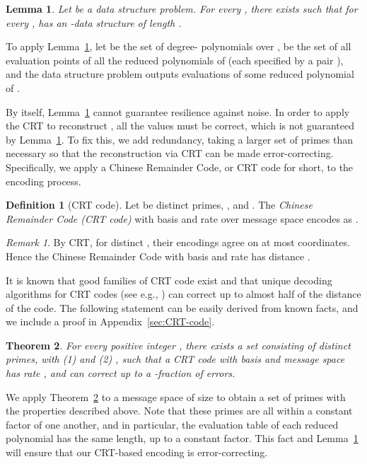 \documentclass[11pt,english]{article}
\newtheorem{theorem}{Theorem}
\newtheorem{lem}[theorem]{Lemma}
\theoremstyle{definition}
\newtheorem{defn}{Definition}
\theoremstyle{remark}
\newtheorem*{rem}{Remark}
\begin{document}
\begin{lem}\label{lem:non-binary RLDC} Let 
be a data structure problem. For every ,
there exists  such that for every
,  has an -data
structure of length . \end{lem}

To apply Lemma~\ref{lem:non-binary RLDC}, let  be the
set of degree- polynomials over ,  be the set
of all evaluation points of all the reduced polynomials of  (each specified by a pair ), and
the data structure problem  outputs evaluations of some reduced
polynomial of . 

By itself, Lemma~\ref{lem:non-binary RLDC} cannot guarantee resilience
against noise. In order to apply the CRT to reconstruct , all
the values  must be correct, which is
not guaranteed by Lemma~\ref{lem:non-binary RLDC}. To fix this,
we add redundancy, taking a larger set of primes than necessary so that the reconstruction
via CRT can be made error-correcting. Specifically, we apply a Chinese
Remainder Code, or CRT code for short, to the encoding process. 

\begin{defn}[CRT code]\label{def:crtcode}Let 
be distinct primes, , and .
The \emph{Chinese Remainder Code (CRT code)} with basis 
and rate  over message space  encodes  
as .
\end{defn}

\begin{rem} By CRT, for distinct , their encodings
agree on at most  coordinates. Hence the Chinese Remainder Code
with basis  and rate  has distance
. \end{rem}

It is known that good families of CRT code exist and that
unique decoding algorithms for CRT codes (see e.g., \cite{grs:crt-errors})
can correct up to almost half of the distance of the code. The following
statement can be easily derived from known facts, and we include a
proof in Appendix~\ref{sec:CRT-code}. 

\begin{theorem}\label{thm:CRT code}For every positive integer ,
there exists a set  consisting of distinct primes, with (1) 
and (2)  , such that a CRT
code with basis  and message space  has rate ,
and can correct up to a -fraction of errors. 
\end{theorem}

We apply Theorem~\ref{thm:CRT code} to a message space of size  to obtain 
a set of primes  with the properties described above.
Note that these primes are all within a constant
factor of one another, and in particular, the evaluation table of
each reduced polynomial has the same length, up to a constant factor.
This fact and Lemma~\ref{lem:non-binary RLDC} will ensure that our CRT-based
encoding is error-correcting.
\end{document}
